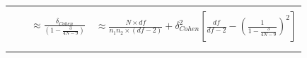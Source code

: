 \documentclass[
  english,
  man,floatsintext]{apa6}
\begin{document}
\begin{landscape}
\begin{longtable}[]{@{}lccc@{}}
\begin{minipage}[t]{0.12\columnwidth}
\end{minipage} & \begin{minipage}[t]{0.11\columnwidth}\centering
\strut
\end{minipage} & \begin{minipage}[t]{0.24\columnwidth}\centering
\strut
\end{minipage} & \begin{minipage}[t]{0.42\columnwidth}\centering
\strut
\end{minipage}\tabularnewline
\begin{minipage}[t]{0.12\columnwidth}\raggedright
\strut
\end{minipage} & \begin{minipage}[t]{0.11\columnwidth}\centering
\strut
\end{minipage} & \begin{minipage}[t]{0.24\columnwidth}\centering
\(\approx \frac{\delta_{Cohen}}{\left(1-\frac{3}{4N-9}\right)}\)\strut
\end{minipage} & \begin{minipage}[t]{0.42\columnwidth}\centering
\(\approx \frac{N\times df}{n_1n_2 \times (df-2)} + \delta^2_{Cohen} \left[ \frac{df}{df-2} - \left( \frac{1}{1-\frac{3}{4N-9} }\right)^2\right]\)\strut
\end{minipage}\tabularnewline
\begin{minipage}[t]{0.12\columnwidth}\raggedright
\strut
\end{minipage} & \begin{minipage}[t]{0.11\columnwidth}\centering
\strut
\end{minipage} & \begin{minipage}[t]{0.24\columnwidth}\centering
\strut
\end{minipage} & \begin{minipage}[t]{0.42\columnwidth}\centering
\strut
\end{minipage}\tabularnewline
\begin{minipage}[t]{0.12\columnwidth}\raggedright
\strut
\end{minipage} & \begin{minipage}[t]{0.11\columnwidth}\centering
\strut
\end{minipage} & \begin{minipage}[t]{0.24\columnwidth}\centering
\strut
\end{minipage} & \begin{minipage}[t]{0.42\columnwidth}\centering
\strut
\end{minipage}\tabularnewline

\end{longtable}
\end{landscape}
\end{document}
